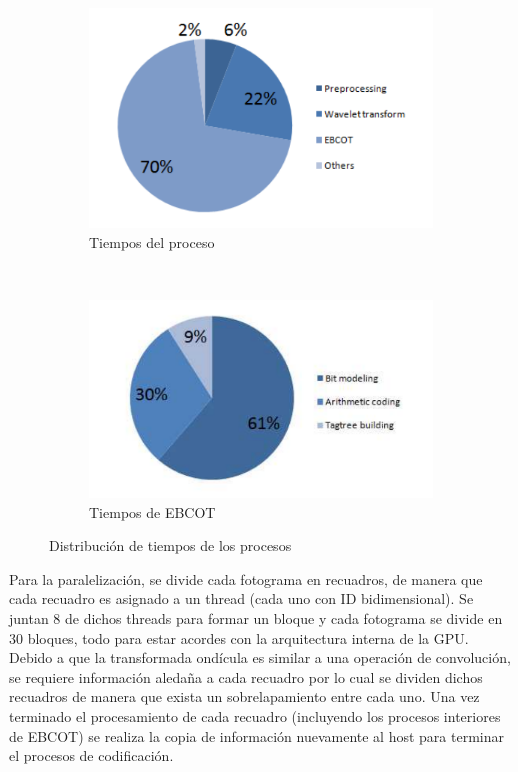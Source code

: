 \documentclass{article}
\begin{document}
\begin{figure}[H]
	\centering
	 \begin{subfigure}[b]{0.48\textwidth}
 		 \includegraphics[width=\textwidth]{c1}
 		 \caption{Tiempos del proceso}
       	 \label{fig:c1}
  	 \end{subfigure}
   ~ 
	\begin{subfigure}[b]{0.48\textwidth}
		\includegraphics[width=\textwidth]{c2}
		\caption{Tiempos de EBCOT}
		\label{fig:c2}
	\end{subfigure}
	\caption{Distribución de tiempos de los procesos \cite{articulo}}
	\label{fig:circulos}
\end{figure}

Para la paralelización, se divide cada fotograma en recuadros, de manera que cada recuadro es asignado a un thread (cada uno con ID bidimensional). Se juntan 8 de dichos threads para formar un bloque y cada fotograma se divide en 30 bloques, todo para estar acordes con la arquitectura interna de la GPU. Debido a que la transformada ondícula es similar a una operación de convolución, se requiere información aledaña a cada recuadro por lo cual se dividen dichos recuadros de manera que exista un sobrelapamiento entre cada uno. Una vez terminado el procesamiento de cada recuadro (incluyendo los procesos interiores de EBCOT) se realiza la copia de información nuevamente al host para terminar el procesos de codificación. 
\end{document}
